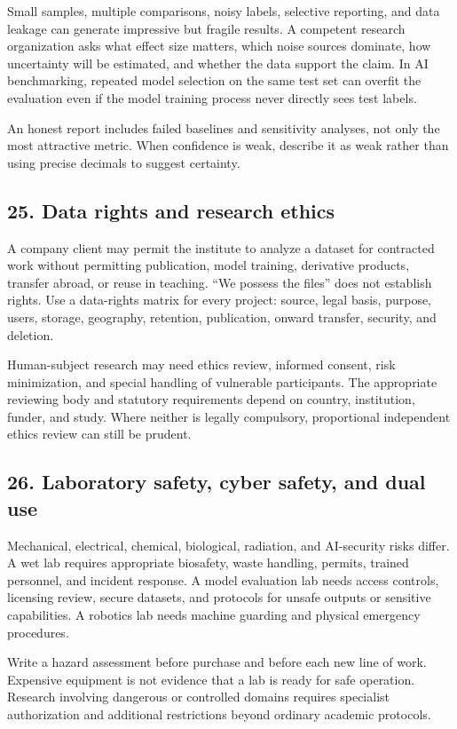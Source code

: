 Small samples, multiple comparisons, noisy labels, selective reporting, and data leakage can generate impressive but fragile results. A competent research organization asks what effect size matters, which noise sources dominate, how uncertainty will be estimated, and whether the data support the claim. In AI benchmarking, repeated model selection on the same test set can overfit the evaluation even if the model training process never directly sees test labels.

An honest report includes failed baselines and sensitivity analyses, not only the most attractive metric. When confidence is weak, describe it as weak rather than using precise decimals to suggest certainty.

\subsection{25. Data rights and research ethics}

A company client may permit the institute to analyze a dataset for contracted work without permitting publication, model training, derivative products, transfer abroad, or reuse in teaching. ``We possess the files'' does not establish rights. Use a data-rights matrix for every project: source, legal basis, purpose, users, storage, geography, retention, publication, onward transfer, security, and deletion.

Human-subject research may need ethics review, informed consent, risk minimization, and special handling of vulnerable participants. The appropriate reviewing body and statutory requirements depend on country, institution, funder, and study. Where neither is legally compulsory, proportional independent ethics review can still be prudent.

\subsection{26. Laboratory safety, cyber safety, and dual use}

Mechanical, electrical, chemical, biological, radiation, and AI-security risks differ. A wet lab requires appropriate biosafety, waste handling, permits, trained personnel, and incident response. A model evaluation lab needs access controls, licensing review, secure datasets, and protocols for unsafe outputs or sensitive capabilities. A robotics lab needs machine guarding and physical emergency procedures.

Write a hazard assessment before purchase and before each new line of work. Expensive equipment is not evidence that a lab is ready for safe operation. Research involving dangerous or controlled domains requires specialist authorization and additional restrictions beyond ordinary academic protocols.
